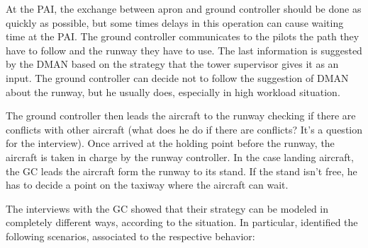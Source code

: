 \documentclass{article}
\begin{document}
At the PAI, the exchange between apron and ground controller should be done as quickly as possible, but some times delays in this operation can cause waiting time at the PAI. 
The ground controller communicates to the pilots the path they have to follow and the runway they have to use. The last information is suggested by the DMAN based on the strategy that the tower supervisor gives it as an input. The ground controller can decide not to follow the suggestion of DMAN about the runway, but he usually does, especially in high workload situation. 

The ground controller then leads the aircraft to the runway checking if there are conflicts with other aircraft (what does he do if there are conflicts? It's a question for the interview).
Once arrived at the holding point before the runway, the aircraft is taken in charge by the runway controller. In the case landing aircraft, the GC leads the aircraft form the runway to its stand. If the stand isn't free, he has to decide a point on the taxiway where the aircraft can wait.

The interviews with the GC showed that their strategy can be modeled in completely different ways, according to the situation. In particular, identified the following scenarios, associated to the respective behavior:
\end{document}

